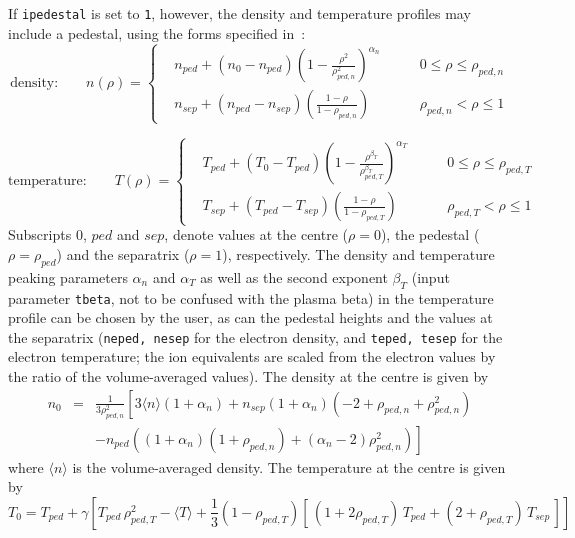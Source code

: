 \documentclass[11pt,a4paper]{report}
\begin{document}
If \texttt{ipedestal} is set to \texttt{1}, however, the density and
temperature profiles may include a pedestal, using the forms specified
in~\cite{helios}:
\begin{equation}
\mbox{density:} \qquad n(\rho) = \left\{ 
\begin{aligned}
  &n_{ped} + (n_0 - n_{ped}) \left( 1 -
    \frac{\rho^2}{\rho_{ped,n}^2}\right)^{\alpha_n}
  &\qquad 0 \leq \rho \leq \rho_{ped,n} \\
  &n_{sep} + (n_{ped} - n_{sep})\left( \frac{1- \rho}{1-\rho_{ped,n}}\right)
  &\qquad \rho_{ped,n} < \rho \leq 1
\end{aligned}
\right.
\end{equation}

\begin{equation}
\mbox{temperature:} \qquad T(\rho) = \left\{ 
\begin{aligned}
  &T_{ped} + (T_0 - T_{ped}) \left( 1 - \frac{\rho^{\beta_T}}
    {\rho_{ped,T}^{\beta_T}}\right)^{\alpha_T} &\qquad 0 \leq \rho \leq \rho_{ped,T} \\
  &T_{sep} + (T_{ped} - T_{sep})\left( \frac{1- \rho}{1-\rho_{ped,T}}\right)
  &\qquad \rho_{ped,T} < \rho \leq 1
\end{aligned}
\right.
\end{equation}
Subscripts $0$, $ped$ and $sep$, denote values at the centre ($\rho = 0$), the
pedestal ($\rho = \rho_{ped}$) and the separatrix ($\rho=1$),
respectively. The density and temperature peaking parameters $\alpha_n$ and
$\alpha_T$ as well as the second exponent $\beta_T$ (input parameter
\texttt{tbeta}, not to be confused with the plasma beta) in the temperature
profile can be chosen by the user, as can the pedestal heights and the values
at the separatrix (\texttt{neped, nesep} for the electron density, and
\texttt{teped, tesep} for the electron temperature; the ion equivalents are
scaled from the electron values by the ratio of the volume-averaged values).
The density at the centre is given by
\begin{eqnarray}
  \nonumber
  n_0 &= & \frac{1}{3\rho_{ped,n}^2} \left[3\langle n\rangle (1+\alpha_n)
    + n_{sep} (1+\alpha_n) (-2 + \rho_{ped,n} + \rho_{ped,n}^2) \right.\\
  && \left. - n_{ped}\left( (1 + \alpha_n)(1+ \rho_{ped,n}) + (\alpha_n -2)
    \rho_{ped,n}^2 \right) \right]
\end{eqnarray}
where $\langle n \rangle$ is the volume-averaged density. The temperature at
the centre is given by
\begin{equation}
T_0 = T_{ped} + \gamma \left[ T_{ped}\, \rho_{ped,T}^2 - \langle T \rangle +
  \frac{1}{3}(1 - \rho_{ped,T}) \left[ \, (1 + 2\rho_{ped,T}) \, T_{ped} + ( 2 +
    \rho_{ped,T}) \, T_{sep} \, \right] \right]
\end{equation}
\end{document}
